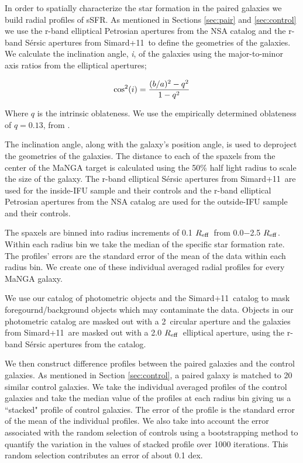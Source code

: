 \documentclass[iop,revtex4,twocolumn,apj,numberedappendix,appendixfloats]{emulateapj}
\newcommand{\reff}{$R_{\rm eff}$}
\newcommand{\simard}{Simard+11}
\begin{document}
In order to spatially characterize the star formation in the paired galaxies we build radial profiles of sSFR. As mentioned in Sections \ref{sec:pair} and \ref{sec:control} we use the r-band elliptical Petrosian apertures from the NSA catalog and the r-band S\'ersic apertures from \simard\ to define the geometries of the galaxies. We calculate the inclination angle, {\it i}, of the galaxies using the major-to-minor axis ratios from the elliptical apertures;

\begin{equation}
{\rm cos^2}(i) = \frac{(b/a)^2 - q^2}{1 - q^2}
\end{equation}

Where $q$ is the intrinsic oblateness. We use the empirically determined oblateness of $q = 0.13$, from \citet{Giovanelli:1994}.

The inclination angle, along with the galaxy's position angle, is used to deproject the geometries of the galaxies. The distance to each of the spaxels from the center of the MaNGA target is calculated using the 50\% half light radius to scale the size of the galaxy. The r-band elliptical S\'ersic apertures from \simard\ are used for the inside-IFU sample and their controls and the r-band elliptical Petrosian apertures from the NSA catalog are used for the outside-IFU sample and their controls. 

The spaxels are binned into radius increments of 0.1 \reff\ from 0.0$-$2.5 \reff. Within each radius bin we take the median of the specific star formation rate. The profiles' errors are the standard error of the mean of the data within each radius bin. We create one of these individual averaged radial profiles for every MaNGA galaxy. 

We use our catalog of photometric objects and the \simard\ catalog to mask foregournd/background objects which may contaminate the data. Objects in our photometric catalog are masked out with a 2\arcsec\ circular aperture and the galaxies from \simard\ are masked out with a 2.0 \reff\ elliptical aperture, using the r-band S\'ersic apertures from the catalog. 

We then construct difference profiles between the paired galaxies and the control galaxies. As mentioned in Section \ref{sec:control}, a paired galaxy is matched to 20 similar control galaxies. We take the individual averaged profiles of the control galaxies and take the median value of the profiles at each radius bin giving us a ``stacked" profile of control galaxies. The error of the profile is the standard error of the mean of the individual profiles. We also take into account the error associated with the random selection of controls using a bootstrapping method to quantify the variation in the values of stacked profile over 1000 iterations. This random selection contributes an error of about 0.1 dex.
\end{document}
